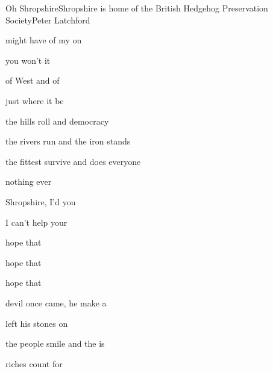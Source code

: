 \begin{SBSong}{Oh Shropshire}{Shropshire is home of the British Hedgehog Preservation Society}{Peter Latchford}
  \begin{SBVerse}
     might have  of my  on 

     you won't   it 

     of West and  of 

     just where it  be
  \end{SBVerse}

  \begin{SBVerse}
     the hills roll  and democracy 

     the rivers run  and the iron  stands

     the fittest survive and  does everyone 

     nothing ever 
  \end{SBVerse}

  \begin{SBChorus}
     Shropshire, I'd  you 

     I can't help  your 

     hope that  

     hope that  

     hope that  
  \end{SBChorus}

  \begin{SBVerse}
     devil once came, he  make a 

     left his stones on 

     the people smile and the  is 

     riches count for 
  \end{SBVerse}


\end{SBSong}
